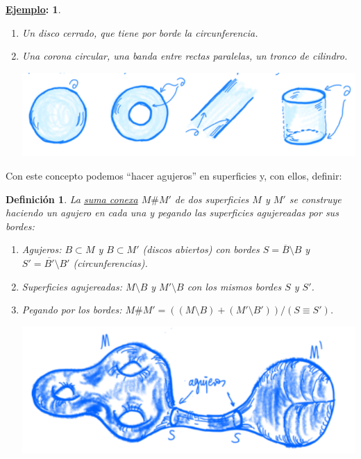 \documentclass[10pt,a4paper,openright]{book}
\theoremstyle{break}
\newtheorem*{defi}{Definición}
\newtheorem*{ej}{\underline{Ejemplo}:}
\begin{document}
\begin{ej}
\begin{enumerate}
    \item Un disco cerrado, que tiene por borde la circunferencia.
    \item Una corona circular, una banda entre rectas paralelas, un tronco de cilindro. 
    \begin{center}
        \includegraphics[scale=0.3]{images/ej_con_borde} 
    \end{center}
\end{enumerate}
\end{ej}

Con este concepto podemos ``hacer agujeros'' en superficies y, con ellos, definir:
\begin{defi}
La \underline{suma conexa} $M \# M'$ de dos superficies $M$ y $M'$ se construye haciendo un agujero en cada una y pegando las superficies agujereadas por sus bordes:
\begin{enumerate}
    \item Agujeros: $B \subset M$ y $B \subset M'$ (discos abiertos) con bordes $S = \overline{B} \setminus B$ y $S' = \overline{B'} \setminus B'$ (circunferencias).
    \item Superficies agujereadas: $M\setminus B$ y $M'\setminus B$ con los mismos bordes $S$ y $S'$.
    \item Pegando por los bordes: $M \# M' = \left( \left( M \setminus B \right) + \left( M' \setminus B' \right) \right) / \left( S \equiv S' \right)$.
    \begin{center}
        \includegraphics[scale=0.3]{images/def_suma_conexa} 
    \end{center}
\end{enumerate}
\end{defi}
\end{document}
